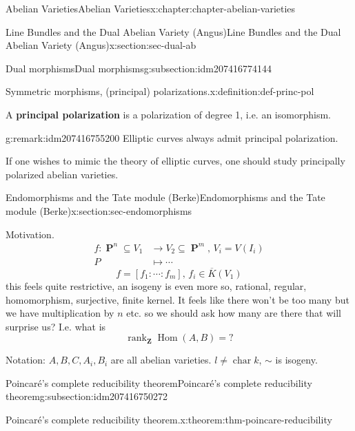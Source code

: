 \documentclass[oneside,10pt,]{book}
\newcommand{\terminology}[1]{\textbf{#1}}
\numberwithin{equation}{section}
\newcommand{\lb}{[}
\newcommand{\rb}{]}
\newcommand{\ZZ}{\mathbf{Z}}
\DeclareMathOperator{\Hom}{Hom}
\DeclareMathOperator{\rank}{rank}
\DeclareMathOperator{\characteristic}{char}
\DeclareMathOperator{\PP}{\mathbf{P}}
\newcommand{\amp}{&}
\begin{document}
\begin{chapterptx}{Abelian Varieties}{}{Abelian Varieties}{}{}{x:chapter:chapter-abelian-varieties}
\begin{sectionptx}{Line Bundles and the Dual Abelian Variety (Angus)}{}{Line Bundles and the Dual Abelian Variety (Angus)}{}{}{x:section:sec-dual-ab}
\begin{subsectionptx}{Dual morphisms}{}{Dual morphisms}{}{}{g:subsection:idm207416774144}
\begin{definition}{Symmetric morphisms, (principal) polarizations.}{x:definition:def-princ-pol}
\par
A \terminology{principal polarization} is a polarization of degree 1, i.e. an isomorphism.%
\end{definition}
\begin{remark}{}{g:remark:idm207416755200}%
Elliptic curves always admit principal polarization.%
\par
If one wishes to mimic the theory of elliptic curves, one should study principally polarized abelian varieties.%
\end{remark}
\end{subsectionptx}
\end{sectionptx}
%
%
\typeout{************************************************}
\typeout{************************************************}
%
\begin{sectionptx}{Endomorphisms and the Tate module (Berke)}{}{Endomorphisms and the Tate module (Berke)}{}{}{x:section:sec-endomorphisms}
\begin{introduction}{Motivation.}%
%
\begin{align*}
f \colon \PP^n\subseteq V_1 \amp\to V_2 \subseteq \PP^m,\,V_i = V(I_i)\\
P\amp \mapsto \cdots
\end{align*}
%
\begin{equation*}
f = \lb f_1 : \cdots : f_m\rb ,\,f_i\in \overline K (V_1)
\end{equation*}
this feels quite restrictive, an isogeny is even more so, rational, regular, homomorphism, surjective, finite kernel. It feels like there won't be too many but we have multiplication by \(n\) etc. so we should ask how many are there that will surprise us? I.e. what is%
\begin{equation*}
\rank_\ZZ \Hom(A,B) = ?
\end{equation*}
%
\par
Notation: \(A,B,C , A_i,  B_i\) are all abelian varieties. \(l \ne \characteristic k\), \(\sim\) is isogeny.%
\end{introduction}%
%
%
\typeout{************************************************}
\typeout{************************************************}
%
\begin{subsectionptx}{Poincaré's complete reducibility theorem}{}{Poincaré's complete reducibility theorem}{}{}{g:subsection:idm207416750272}
\begin{theorem}{Poincaré's complete reducibility theorem.}{}{x:theorem:thm-poincare-reducibility}%

\end{theorem}
\end{subsectionptx}
\end{sectionptx}
\end{chapterptx}
\end{document}
